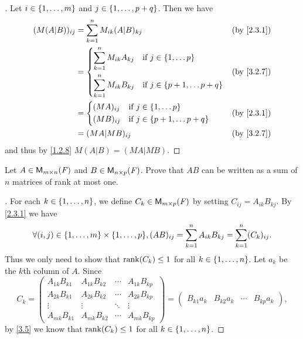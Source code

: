 \begin{proof}[]
  Let \(i \in \left\lbrace1, \dots, m\right\rbrace\) and \(j \in \left\lbrace1, \dots, p + q\right\rbrace\).
  Then we have
  \begin{align*}
    (M (A | B))_{i j} & = \sum_{k = 1}^n M_{i k} (A | B)_{k j}                                        &  & \by{2.3.1} \\
                      & = \begin{dcases}
                            \sum_{k = 1}^n M_{i k} A_{k j} & \text{if } j \in \set{1, \dots p}         \\
                            \sum_{k = 1}^n M_{i k} B_{k j} & \text{if } j \in \set{p + 1, \dots p + q}
                          \end{dcases} &  & \by{3.2.7}                  \\
                      & = \begin{dcases}
                            (MA)_{i j} & \text{if } j \in \set{1, \dots p}         \\
                            (MB)_{i j} & \text{if } j \in \set{p + 1, \dots p + q}
                          \end{dcases}                     &  & \by{2.3.1}                                      \\
                      & = (MA | MB)_{i j}                                                             &  & \by{3.2.7}
  \end{align*}
  and thus by \cref{1.2.8} \(M (A | B) = (MA | MB)\).
\end{proof}

\setcounter{ex}{17}
\begin{ex}\label{ex:3.2.18}
  Let \(A \in \ms\) and \(B \in \ms[n][p][\F]\).
  Prove that \(AB\) can be written as a sum of \(n\) matrices of rank at most one.
\end{ex}

\begin{proof}[]
  For each \(k \in \left\lbrace1, \dots, n\right\rbrace\), we define \(C_k \in \ms[m][p][\F]\) by setting \(C_{i j} = A_{i k} B_{k j}\).
  By \cref{2.3.1} we have
  \[
    \forall (i, j) \in \set{1, \dots, m} \times \set{1, \dots, p}, (AB)_{i j} = \sum_{k = 1}^n A_{i k} B_{k j} = \sum_{k = 1}^n (C_k)_{i j}.
  \]
  Thus we only need to show that \(\rk{C_k} \leq 1\) for all \(k \in \left\lbrace1, \dots, n\right\rbrace\).
  Let \(a_k\) be the \(k\)th column of \(A\).
  Since
  \[
    C_k = \begin{pmatrix}
      A_{1 k} B_{k 1} & A_{1 k} B_{k 2} & \cdots & A_{1 k} B_{k p} \\
      A_{2 k} B_{k 1} & A_{2 k} B_{k 2} & \cdots & A_{2 k} B_{k p} \\
      \vdots          & \vdots          & \ddots & \vdots          \\
      A_{m k} B_{k 1} & A_{m k} B_{k 2} & \cdots & A_{m k} B_{k p}
    \end{pmatrix} = \begin{pmatrix}
      B_{k 1} a_k & B_{k 2} a_k & \cdots & B_{k p} a_k
    \end{pmatrix},
  \]
  by \cref{3.5} we know that \(\rk{C_k} \leq 1\) for all \(k \in \left\lbrace1, \dots, n\right\rbrace\).
\end{proof}

